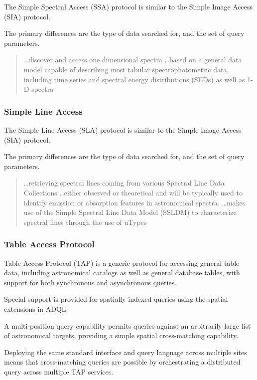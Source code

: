 \documentclass{article}
\begin{document}
{The Simple Spectral Access (SSA) protocol is similar to the Simple Image Access (SIA) protocol.

The primary differences are the type of data searched for, and the set of query
parameters.

\begin{quote}
\ldots discover and access one dimensional spectra
\ldots based on a general data model capable of describing most tabular
spectrophotometric data, including time series and spectral energy distributions
(SEDs) as well as 1-D spectra
\end{quote}

\subsubsection{Simple Line Access}

The Simple Line Access (SLA) protocol is similar to the Simple Image Access
(SIA) protocol.

The primary differences are the type of data searched for, and the set of query
parameters.

\begin{quote}
\ldots retrieving spectral lines coming from various Spectral Line Data
Collections
\ldots either observed or theoretical and will be typically used to identify
emission or absorption features in astronomical spectra.
\ldots makes use of the Simple Spectral Line Data Model
(SSLDM)  to characterize spectral
lines through the use of uTypes
\end{quote}
  
\subsubsection{Table Access Protocol}

Table Access Protocol (TAP) is a generic protocol for accessing general table
data, including astronomical catalogs as well as general database tables, with
support for both synchronous and asynchronous queries.

Special support is provided for spatially indexed queries using the spatial
extensions in ADQL.

A multi-position query capability permits queries against an arbitrarily large
list of astronomical targets, providing a simple spatial cross-matching
capability.

Deploying the same standard interface and query language across multiple sites
means that cross-matching queries are possible by orchestrating a distributed
query across multiple TAP services.

}
\end{document}
